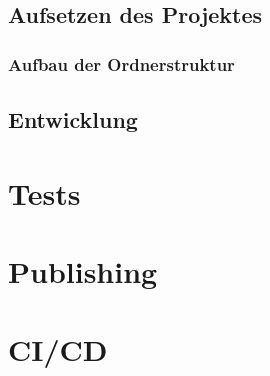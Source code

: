 \subsection{Aufsetzen des Projektes}

\subsubsection{Aufbau der Ordnerstruktur}

\subsection{Entwicklung}

\section{Tests}
\label{sec:EntwicklungVsCode_Tests}

\section{Publishing}
\label{sec:EntwicklungVsCode_Publishing}

\section{CI/CD}
\label{sec:EntwicklungVsCode_CICD}